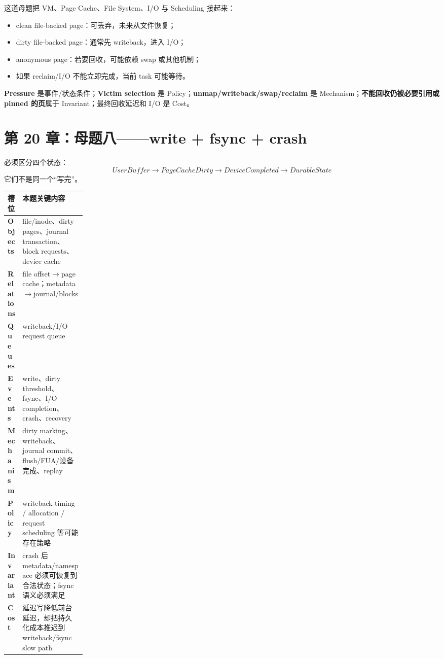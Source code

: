 \documentclass[11pt,a4paper]{ctexart}
\newcommand{\kw}[1]{\textbf{#1}}
\begin{document}
这道母题把 VM、Page Cache、File System、I/O 与 Scheduling 接起来：
\begin{itemize}
  \item clean file-backed page：可丢弃，未来从文件恢复；
  \item dirty file-backed page：通常先 writeback，进入 I/O；
  \item anonymous page：若要回收，可能依赖 swap 或其他机制；
  \item 如果 reclaim/I/O 不能立即完成，当前 task 可能等待。
\end{itemize}

\begin{corebox}[最关键的分工]
\kw{Pressure} 是事件/状态条件；\kw{Victim selection} 是 Policy；\kw{unmap/writeback/swap/reclaim} 是 Mechanism；\kw{不能回收仍被必要引用或 pinned 的页}属于 Invariant；最终回收延迟和 I/O 是 Cost。
\end{corebox}

\section{第 20 章：母题八——write + fsync + crash}

必须区分四个状态：
\[
\boxed{UserBuffer\rightarrow PageCacheDirty\rightarrow DeviceCompleted\rightarrow DurableState}
\]
它们不是同一个“写完”。

\begin{center}
\small
\begin{tabularx}{\linewidth}{>{\bfseries}p{0.18\linewidth} X}
\toprule
槽位 & 本题关键内容 \\
\midrule
Objects & file/inode、dirty pages、journal transaction、block requests、device cache \\
Relations & file offset$\to$page cache；metadata$\to$journal/blocks \\
Queues & writeback/I/O request queue \\
Events & write、dirty threshold、fsync、I/O completion、crash、recovery \\
Mechanism & dirty marking、writeback、journal commit、flush/FUA/设备完成、replay \\
Policy & writeback timing / allocation / request scheduling 等可能存在策略 \\
Invariant & crash 后 metadata/namespace 必须可恢复到合法状态；fsync 语义必须满足 \\
Cost & 延迟写降低前台延迟，却把持久化成本推迟到 writeback/fsync slow path \\
\bottomrule
\end{tabularx}
\end{center}
\end{document}

